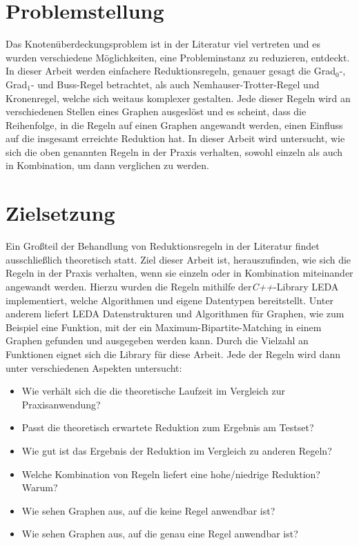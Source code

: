 \section{Problemstellung}
\label{ch:Einleitung:sec:Problemstellung}

Das Knotenüberdeckungsproblem ist in der Literatur viel vertreten und es wurden verschiedene Möglichkeiten, eine Probleminstanz zu reduzieren, entdeckt. In dieser Arbeit werden einfachere Reduktionsregeln, genauer gesagt die Grad$_{0}$-, Grad$_{1}$- und Buss-Regel betrachtet, als auch Nemhauser-Trotter-Regel und Kronenregel, welche sich weitaus komplexer gestalten. Jede dieser Regeln wird an verschiedenen Stellen eines Graphen ausgeslöst und es scheint, dass die Reihenfolge, in die Regeln auf einen Graphen angewandt werden, einen Einfluss auf die insgesamt erreichte Reduktion hat. In dieser Arbeit wird untersucht, wie sich die oben genannten Regeln in der Praxis verhalten, sowohl einzeln als auch in Kombination, um dann verglichen zu werden. 

\section{Zielsetzung}
\label{ch:Einleitung:sec:Zielsetzung}

Ein Großteil der Behandlung von Reduktionsregeln in der Literatur findet ausschließlich theoretisch statt.
Ziel dieser Arbeit ist, herauszufinden, wie sich die Regeln in der Praxis verhalten, wenn sie einzeln oder in Kombination miteinander angewandt werden. Hierzu wurden die Regeln mithilfe der\emph{C++}-Library LEDA \cite{manual} implementiert, welche Algorithmen und eigene Datentypen bereitstellt. Unter anderem liefert LEDA Datenstrukturen und Algorithmen für Graphen, wie zum Beispiel eine Funktion, mit der ein Maximum-Bipartite-Matching in einem Graphen gefunden und ausgegeben werden kann. Durch die Vielzahl an Funktionen eignet sich die Library für diese Arbeit. Jede der  Regeln wird dann unter verschiedenen Aspekten untersucht:
\begin{itemize}
\item Wie verhält sich die die theoretische Laufzeit im Vergleich zur Praxisanwendung?
\item Passt die theoretisch erwartete Reduktion zum Ergebnis am Testset?
\item Wie gut ist das Ergebnis der Reduktion im Vergleich zu anderen Regeln?
\item Welche Kombination von Regeln liefert eine hohe/niedrige Reduktion? Warum?
\item Wie sehen Graphen aus, auf die keine Regel anwendbar ist?
\item Wie sehen Graphen aus, auf die genau eine Regel anwendbar ist?
\end{itemize}

